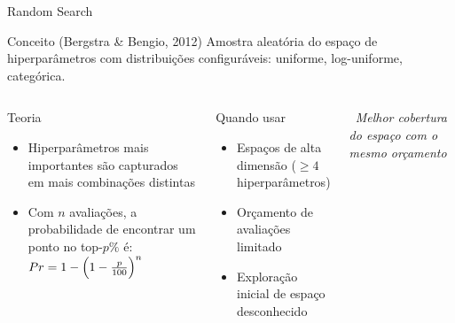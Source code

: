 \documentclass[aspectratio=169]{beamer}
\begin{document}
\begin{frame}{Random Search}
     \begin{block}{Conceito (Bergstra \& Bengio, 2012)}
            \footnotesize
            Amostra aleatória do espaço de hiperparâmetros com distribuições configuráveis: uniforme, log-uniforme, categórica.
        \end{block}
    \begin{columns}
       
        \begin{block}{Teoria}
            \begin{itemize}\footnotesize
                \item Hiperparâmetros mais importantes são capturados em mais combinações distintas
                \item Com $n$ avaliações, a probabilidade de encontrar um ponto no top-$p\%$ é:
                $Pr = 1 - \Bigl(1 - \tfrac{p}{100}\Bigr)^{n}$
            \end{itemize}
        \end{block}
        \begin{alertblock}{Quando usar}
            \begin{itemize}\footnotesize
                \item Espaços de alta dimensão ($\geq 4$ hiperparâmetros)
                \item Orçamento de avaliações limitado
                \item Exploração inicial de espaço desconhecido
            \end{itemize}
        \end{alertblock}
        \centering
        \vspace{0.1cm}
        \textit{\faArrowRight\ Melhor cobertura do espaço com o mesmo orçamento}
    \end{columns}
\end{frame}
\end{document}

